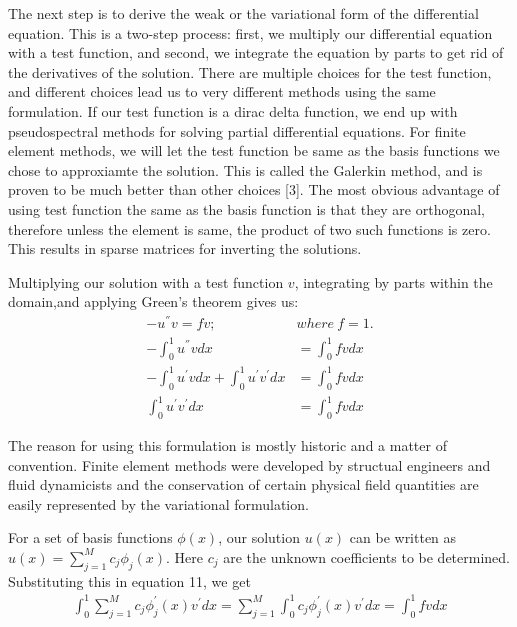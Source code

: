 \documentclass{article}
\begin{document}
The next step is to derive the weak or the variational form of the differential equation. This is a two-step process: first, we multiply our differential equation with a test function, and second, we integrate the equation by parts to get rid of the derivatives of the solution. There are multiple choices for the test function, and different choices lead us to very different methods using the same formulation. If our test function is a dirac delta function, we end up with pseudospectral methods for solving partial differential equations. For finite element methods, we will let the test function be same as the basis functions we chose to approxiamte the solution. This is called the Galerkin method, and is proven to be much better than other choices [3]. The most obvious advantage of using test function the same as the basis function is that they are orthogonal, therefore unless the element is same, the product of two such functions is zero. This results in sparse matrices for inverting the solutions.

Multiplying our solution with a test function $v$, integrating by parts within the domain,and applying Green's theorem gives us:
\begin{align}
    -u^{''}v = fv;\ &where\ f = 1. \\
    -\int_{0}^{1}u^{''}vdx &= \int_{0}^{1}fvdx \\
    -\int_{0}^{1}u^{'}vdx + \int_{0}^{1}u^{'}v^{'} dx &= \int_{0}^{1}fvdx \\
    \int_{0}^{1}u^{'}v^{'} dx &= \int_{0}^{1}fvdx 
\end{align}

The reason for using this formulation is mostly historic and a matter of convention. Finite element methods were developed by structual engineers and fluid dynamicists and the conservation of certain physical field quantities are easily represented by the variational formulation.

For a set of basis functions $\phi(x)$, our solution $u(x)$ can be written as $u(x) = \sum_{j=1}^{M}c_j\phi_j(x)$. Here $c_j$ are the unknown coefficients to be determined. Substituting this in equation 11, we get
\begin{align}
    \int_{0}^{1}\sum_{j=1}^{M}c_j\phi_j^{'}(x)v^{'} dx =
    \sum_{j=1}^{M}\int_{0}^{1}c_j\phi_j^{'}(x)v^{'} dx =
    \int_{0}^{1}fvdx 
\end{align}
\end{document}
